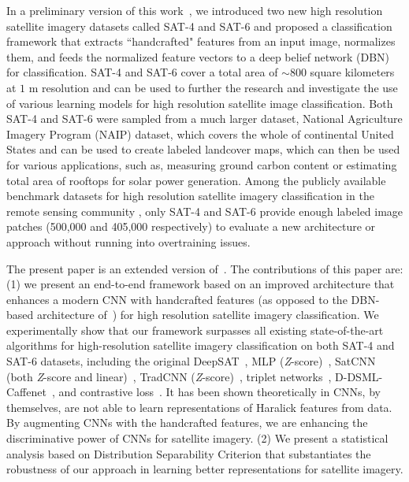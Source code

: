 \documentclass[]{interact}
\theoremstyle{plain}\newtheorem{theorem}{Theorem}[section]
\theoremstyle{definition}
\theoremstyle{remark}
\begin{document}
In a   preliminary version of this work~\citep{basu2015},
we introduced  two new high resolution satellite imagery datasets called SAT-4 and SAT-6 and proposed a classification framework that extracts ``handcrafted" features from an input image, normalizes them, and feeds the normalized feature vectors to a deep belief network (DBN) for classification. SAT-4 and SAT-6 cover a total area of ${\sim}800$ square kilometers at $1$ m resolution  and  can be used to further the research and investigate the use of various learning models for high resolution satellite  image classification. Both SAT-4 and SAT-6 were sampled from a much larger dataset, National Agriculture Imagery Program (NAIP) dataset, which covers the whole of continental United States and can be used to create labeled landcover maps, which can then be used for various applications, such as, measuring ground carbon content or estimating total area of rooftops for solar power generation. Among the publicly available benchmark datasets for high resolution satellite imagery classification  in the remote sensing community \citep{ml}, only SAT-4 and SAT-6 provide enough labeled image patches (500,000 and 405,000 respectively) to evaluate a new architecture or approach without running into overtraining issues. 

The present paper is an extended version of~\citep{basu2015}. The contributions of this paper are: (1) we present an end-to-end framework based on an improved architecture that enhances  a modern CNN  with handcrafted features (as opposed to the DBN-based architecture of~\citep{basu2015}) for high resolution satellite imagery classification. We experimentally show that our framework surpasses  all existing state-of-the-art algorithms for high-resolution satellite imagery classification on both SAT-4 and SAT-6 datasets, including the original DeepSAT~\citep{basu2015}, MLP (\textit{Z}-score)~\citep{zhong2017satcnn}, SatCNN (both \textit{Z}-score and linear)~\citep{zhong2017satcnn}, TradCNN (\textit{Z}-score)~\citep{zhong2017satcnn}, triplet networks~\citep{liu2018scene}, D-DSML-Caffenet~\citep{gong2018diversity}, and contrastive loss~\citep{simo2015discriminative}. It has been shown theoretically in \citep{basujournal,basuijcnn} CNNs, by themselves, are not able to learn representations of  Haralick features from data.   By augmenting CNNs with the handcrafted features, we are enhancing the discriminative power of CNNs for satellite imagery. (2) We present a statistical analysis based on Distribution Separability Criterion  that substantiates the robustness of our approach in learning better representations for satellite imagery. 
\end{document}
